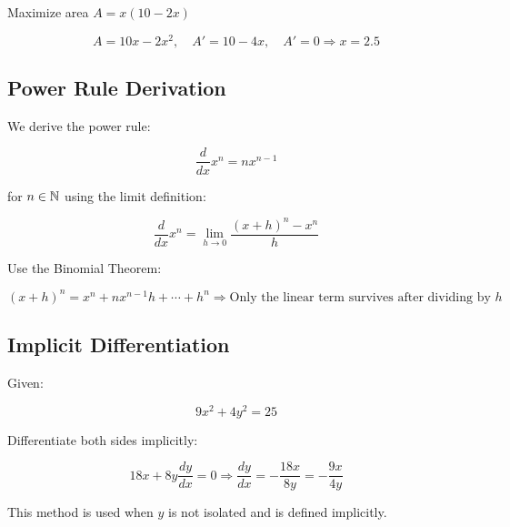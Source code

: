 Maximize area \(A = x(10 - 2x)\)

\[
    A = 10x - 2x^2, \quad A' = 10 - 4x, \quad A' = 0 \Rightarrow x = 2.5
\]

\subsection{Power Rule Derivation}

We derive the power rule:


\[
    \frac{d}{dx} x^n = nx^{n - 1}
\]

for \(n \in \mathbb{N}\) using the limit definition:

\[
    \frac{d}{dx} x^n = \lim_{h \to 0} \frac{{(x + h)}^n - x^n}{h}
\]

Use the Binomial Theorem:

\[
    {(x + h)}^n = x^n + nx^{n-1}h + \cdots + h^n
    \Rightarrow \text{Only the linear term survives after dividing by } h
\]

\subsection{Implicit Differentiation}

Given:

\[
    9x^2 + 4y^2 = 25
\]

Differentiate both sides implicitly:

\[
    18x + 8y \frac{dy}{dx} = 0
    \Rightarrow \frac{dy}{dx} = -\frac{18x}{8y} = -\frac{9x}{4y}
\]

This method is used when \(y\) is not isolated and is defined implicitly.

